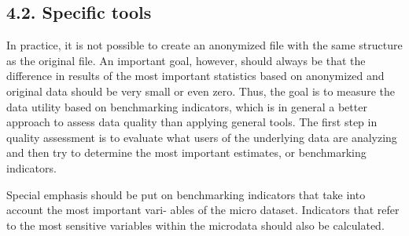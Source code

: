 \documentclass[]{article}
\begin{document}
\subsection*{4.2. Specific tools}
In practice, it is not possible to create an anonymized ﬁle with the same structure as
the original file. An important goal, however, should always be that the difference
in results of the most important statistics based on anonymized and original data
should be very small or even zero. Thus, the goal is to measure the data utility
based on benchmarking indicators, which
is in general a better approach to assess data quality than applying general tools.
The ﬁrst step in quality assessment is to evaluate what users of the underlying
data are analyzing and then try to determine the most important estimates, or
benchmarking indicators.

Special emphasis should be
put on benchmarking indicators that take into account the most important vari-
ables of the micro dataset. Indicators that refer to the most sensitive variables
within the microdata should also be calculated. 
\end{document}
